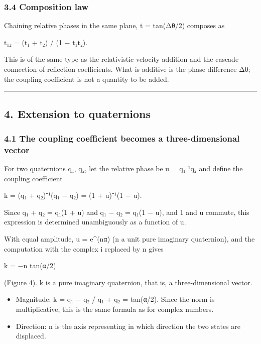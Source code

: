 \documentclass[
  a4paper,
]{article}
\providecommand{\tightlist}{%
  \setlength{\itemsep}{0pt}\setlength{\parskip}{0pt}}
\begin{document}
\subsubsection{3.4 Composition law}\label{composition-law}

Chaining relative phases in the same plane, t = tan(Δθ/2) composes as

t₁₂ = (t₁ + t₂) / (1 − t₁t₂).

This is of the same type as the relativistic velocity addition and the
cascade connection of reflection coefficients. What is additive is the
phase difference Δθ; the coupling coefficient is not a quantity to be
added.

\begin{center}\rule{0.5\linewidth}{0.5pt}\end{center}

\subsection{4. Extension to quaternions}\label{extension-to-quaternions}

\subsubsection{4.1 The coupling coefficient becomes a three-dimensional
vector}\label{the-coupling-coefficient-becomes-a-three-dimensional-vector}

For two quaternions q₁, q₂, let the relative phase be u = q₁⁻¹q₂ and
define the coupling coefficient

k = (q₁ + q₂)⁻¹(q₁ − q₂) = (1 + u)⁻¹(1 − u).

Since q₁ + q₂ = q₁(1 + u) and q₁ − q₂ = q₁(1 − u), and 1 and u commute,
this expression is determined unambiguously as a function of u.

With equal amplitude, u = e\^{}(nα) (n a unit pure imaginary
quaternion), and the computation with the complex i replaced by n gives

k = −n tan(α/2)

(Figure 4). k is a pure imaginary quaternion, that is, a
three-dimensional vector.

\begin{itemize}
\tightlist
\item
  Magnitude: \textbar k\textbar{} = \textbar q₁ − q₂\textbar{} /
  \textbar q₁ + q₂\textbar{} = tan(α/2). Since the norm is
  multiplicative, this is the same formula as for complex numbers.
\item
  Direction: n is the axis representing in which direction the two
  states are displaced.
\end{itemize}
\end{document}
